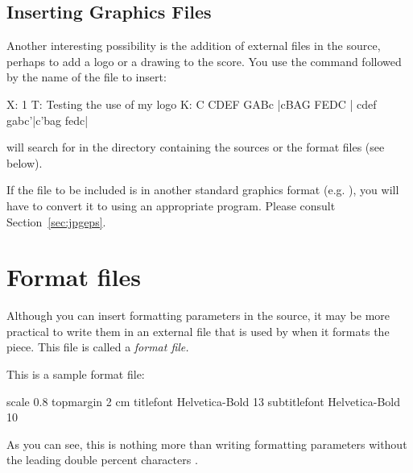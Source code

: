 \documentclass[a4paper,fullpage,12pt]{book}
\begin{document}

\subsection{Inserting Graphics Files}

Another interesting possibility is the addition of external
 files in the source, perhaps to add a logo or a drawing to
the score. You use the  command followed by the name of
the file to insert:

\begin{abcsource}
X: 1
T: Testing the use of my logo
K: C
CDEF GABc |cBAG FEDC |
cdef gabc'|c'bag fedc|
\end{abcsource}


\abcm{} will search for  in the directory containing
the  sources or the format files (see below).

If the file to be included is in another standard graphics format
(e.g. ), you will have to convert it to  using
an appropriate program. Please consult Section~\ref{sec:jpgeps}.




\section{Format files}
\label{sec:formatfiles}

Although you can insert formatting parameters in the source, it may be
more practical to write them in an external file that is used by
\abcm{} when it formats the piece. This file is called a \emph{format
file.}

This is a sample format file:

\begin{abcsource}

scale 0.8
topmargin 2 cm
titlefont Helvetica-Bold 13
subtitlefont Helvetica-Bold 10
\end{abcsource}

As you can see, this is nothing more than writing formatting
parameters without the leading double percent characters \car{\%\%}.
\end{document}

